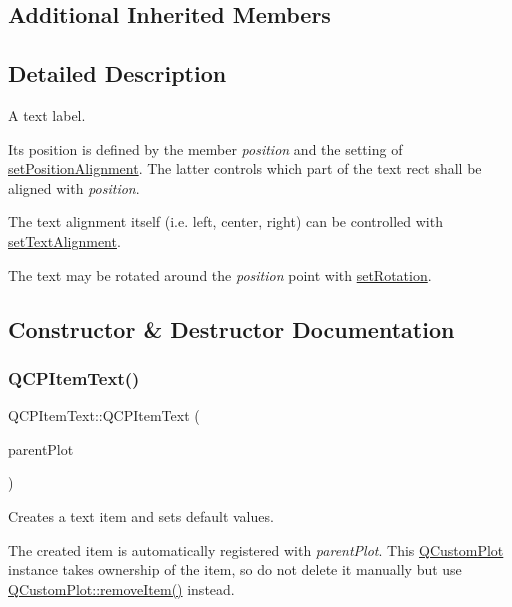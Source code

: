 \subsection*{Additional Inherited Members}


\subsection{Detailed Description}
A text label. 

 Its position is defined by the member {\itshape position} and the setting of \hyperlink{class_q_c_p_item_text_a781cdf8c640fc6a055dcff1e675c8c7a}{set\+Position\+Alignment}. The latter controls which part of the text rect shall be aligned with {\itshape position}.

The text alignment itself (i.\+e. left, center, right) can be controlled with \hyperlink{class_q_c_p_item_text_ab5bc0684c4d1bed81949a11b34dba478}{set\+Text\+Alignment}.

The text may be rotated around the {\itshape position} point with \hyperlink{class_q_c_p_item_text_a4bcc10cd97952c3f749d75824b5077f0}{set\+Rotation}. 

\subsection{Constructor \& Destructor Documentation}
\mbox{\label{class_q_c_p_item_text_a77ff96a2972a00872ff8f8c67143abbe}} 
\subsubsection{\texorpdfstring{Q\+C\+P\+Item\+Text()}{QCPItemText()}}
{\footnotesize\ttfamily Q\+C\+P\+Item\+Text\+::\+Q\+C\+P\+Item\+Text (\begin{DoxyParamCaption}\item[{\hyperlink{class_q_custom_plot}{Q\+Custom\+Plot} $\ast$}]{parent\+Plot }\end{DoxyParamCaption})\hspace{0.3cm}{\ttfamily [explicit]}}

Creates a text item and sets default values.

The created item is automatically registered with {\itshape parent\+Plot}. This \hyperlink{class_q_custom_plot}{Q\+Custom\+Plot} instance takes ownership of the item, so do not delete it manually but use \hyperlink{class_q_custom_plot_ae04446557292551e8fb6e2c106e1848d}{Q\+Custom\+Plot\+::remove\+Item()} instead. 

